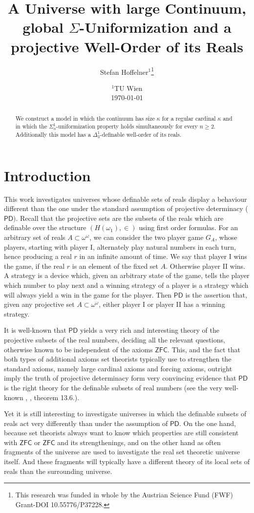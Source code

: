 \documentclass[a4paper,11pt]{article}
\title{A Universe with large Continuum, global $\Sigma$-Uniformization and a projective Well-Order of its Reals}
\author{ Stefan Hoffelner$^{1}$\footnote{This research was funded in whole by the Austrian Science Fund (FWF) Grant-DOI 10.55776/P37228. }  }
\date{
    $^1$TU Wien \\
    \today }
\newcommand{\ZFC}{\mathsf{ZFC}}
\newcommand{\PD}{\mathsf{PD}}
\begin{document}
\maketitle

\begin{abstract}
We construct a model in which the continuum has size $\kappa$ for a regular cardinal $\kappa$ and in which the $\Sigma^1_n$-uniformization property holds simultaneously for every $n \ge 2$. Additionally this model has a $\Delta^1_3$-definable well-order of its reals.
\end{abstract}

\section{Introduction}

This work investigates universes whose definable sets of reals display a behaviour different than the one under the standard assumption of projective determinacy ($\mathsf{PD})$. Recall that the projective sets are the subsets of the reals which are definable over the structure $(H(\omega_1), \in )$ using first order formulas. For an arbitrary set of reals $A \subset \omega^{\omega}$, we can consider the two player game $G_A$, whose players, starting with player I, alternately play natural numbers in each turn, hence producing a real $r$ in an infinite amount of time. We say that player I wins the game, if the real $r$ is an element of the fixed set $A$. Otherwise player II wins. A strategy is a device which, given an arbitrary state of the game, tells the player which number to play next and a winning strategy of a player is a strategy which will always yield a win in the game for the player. Then $\PD$ is the assertion that, given any projective set $A \subset \omega^{\omega}$, either player I or player II has a winning strategy. 

It is well-known that $\PD$ yields a very rich and interesting theory of the projective subsets of the real numbers, deciding all the relevant questions, otherwise known to be independent of the axioms $\ZFC$. This, and the fact that both types of additional axioms set theorists typically use to strengthen the standard axioms, namely large cardinal axioms and forcing axioms, outright imply the truth of projective determinacy form very convincing evidence that $\PD$ is the right theory for the definable subsets of real numbers (see the very well-known \cite{Steel}, \cite{MS}, theorem 13.6.). 

Yet it is still interesting to investigate universes in which the definable subsets of reals act very differently than under the assumption of $\PD$. On the one hand, because set theorists always want to know which properties are still consistent with $\ZFC$ or $\ZFC$ and its strengthenings, and on the other hand as often fragments of the universe are used to investigate the real set theoretic universe itself. And these fragments will typically have a different theory of its local sets of reals than the surrounding universe.
\end{document}
